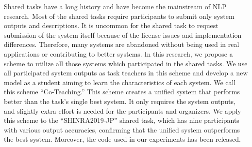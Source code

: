 Shared tasks have a long history and have become the mainstream of NLP research. Most of the shared tasks require participants to submit only system outputs and descriptions. It is uncommon for the shared task to request submission of the system itself because of the license issues and implementation differences. Therefore, many systems are abandoned without being used in real applications or contributing to better systems. In this research, we propose a scheme to utilize all those systems which participated in the shared tasks. We use all participated system outputs as task teachers in this scheme and develop a new model as a student aiming to learn the characteristics of each system. We call this scheme ``Co-Teaching.'' This scheme creates a unified system that performs better than the task's single best system. It only requires the system outputs, and slightly extra effort is needed for the participants and organizers. We apply this scheme to the ``SHINRA2019-JP'' shared task, which has nine participants with various output accuracies, confirming that the unified system outperforms the best system. Moreover, the code used in our experiments has been released.
